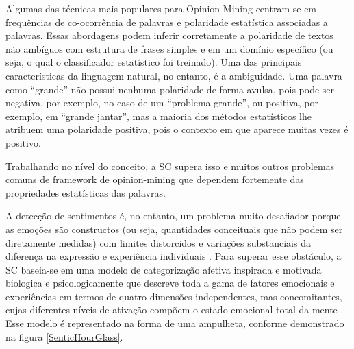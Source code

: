 \documentclass[
	12pt,				%
	openright,			%
	oneside,			%
	a4paper,			%
	english,			%
	spanish,			%
	brazil				%
	]{abntex2}
\begin{document}
Algumas das técnicas mais populares para Opinion Mining centram-se em frequências de co-ocorrência de palavras e polaridade estatística associadas a palavras. Essas abordagens podem inferir corretamente a polaridade de textos não ambíguos com estrutura de frases simples e em um domínio específico (ou seja, o qual o classificador estatístico foi treinado). Uma das principais características da linguagem natural, no entanto, é a ambiguidade. Uma palavra como ``grande'' não possui nenhuma polaridade de forma avulsa, pois pode ser negativa, por exemplo, no caso de um ``problema grande'', ou positiva, por exemplo, em ``grande jantar'', mas a maioria dos métodos estatísticos lhe atribuem uma polaridade positiva, pois o contexto em que aparece muitas vezes é positivo.

Trabalhando no nível do conceito, a SC supera isso e muitos outros problemas comuns de framework de opinion-mining que dependem fortemente das propriedades estatísticas das palavras. 

A detecção de sentimentos é, no entanto, um problema muito desafiador porque as emoções são constructos (ou seja, quantidades conceituais que não podem ser diretamente medidas) com limites distorcidos e variações substanciais da diferença na expressão e experiência individuais \cite{inBook_Bisio2016} . Para superar esse obstáculo, a SC baseia-se em uma modelo de categorização afetiva inspirada e motivada biologica e  psicologicamente que descreve toda a gama de fatores emocionais e experiências em termos de quatro dimensões independentes, mas concomitantes, cujas diferentes níveis de ativação compõem o estado emocional total da mente \cite{book_Cambria2015}. Esse modelo é representado na forma de uma ampulheta, conforme demonstrado na figura \ref{SenticHourGlass}.
\end{document}
